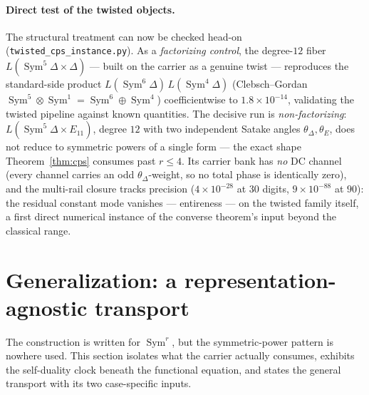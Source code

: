 \documentclass[11pt]{article}
\theoremstyle{definition}
\newcommand{\Sym}{\operatorname{Sym}}
\begin{document}
\paragraph{Direct test of the twisted objects.} The structural treatment can now be checked head-on
(\texttt{twisted\_cps\_instance.py}). As a \emph{factorizing control}, the degree-$12$ fiber
$L(\Sym^5\Delta\times\Delta)$ --- built on the carrier as a genuine twist --- reproduces the standard-side
product $L(\Sym^6\Delta)\,L(\Sym^4\Delta)$ (Clebsch--Gordan $\Sym^5\otimes\Sym^1=\Sym^6\oplus\Sym^4$)
coefficientwise to $1.8\times10^{-14}$, validating the twisted pipeline against known quantities. The decisive
run is \emph{non-factorizing}: $L(\Sym^5\Delta\times E_{11})$, degree $12$ with two independent Satake angles
$\theta_\Delta,\theta_E$, does not reduce to symmetric powers of a single form --- the exact shape
Theorem~\ref{thm:cps} consumes past $r\le4$. Its carrier bank has \emph{no} DC channel (every channel carries an
odd $\theta_\Delta$-weight, so no total phase is identically zero), and the multi-rail closure tracks precision
($4\times10^{-28}$ at $30$ digits, $9\times10^{-88}$ at $90$): the residual constant mode vanishes ---
entireness --- on the twisted family itself, a first direct numerical instance of the converse theorem's input
beyond the classical range.


\section{Generalization: a representation-agnostic transport}\label{sec:general}

The construction is written for $\Sym^r$, but the symmetric-power pattern is nowhere used. This section
isolates what the carrier actually consumes, exhibits the self-duality clock beneath the functional
equation, and states the general transport with its two case-specific inputs.
\end{document}
